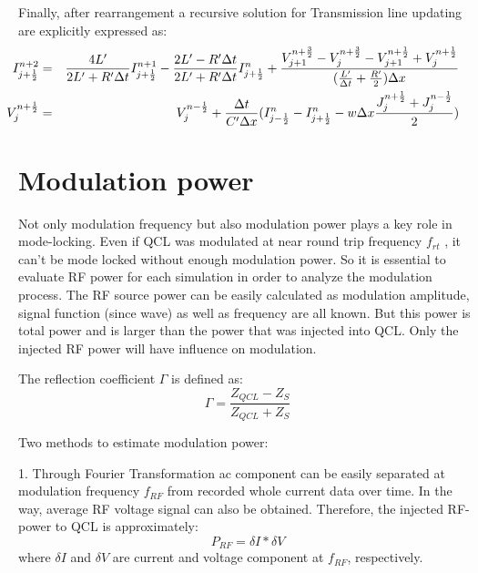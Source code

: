 \documentclass[11pt,final]{scrbook}
\begin{document}
Finally, after rearrangement a recursive solution for Transmission line updating are explicitly expressed as:
\begin{eqnarray}
 \hspace{-8mm} { I }_{ j+\frac{1}{2} }^{ n+2 } &=& \frac { 4L' }{ 2L'+R'\Delta t }{ I }_{ j+\frac{1}{2} }^{ n+1 }-\frac { 2L'-R'\Delta t }{ 2L'+R'\Delta t }{ I }_{ j+\frac{1}{2} }^{ n }+\frac { { V }_{ j+1 }^{ n+\frac{3}{2} }-{ V }_{ j }^{ n+\frac{3}{2}}-{ V }_{ j+1 }^{ n+\frac{1}{2} }+{ V }_{ j }^{ n+\frac{1}{2} } }{  (\frac { L' }{ \Delta t } +\frac { R' }{ 2 })\Delta x }\label{eq:TL_I}\\
 \hspace{-8mm} { V }_{ j }^{ n+\frac{1}{2} } &=& { V }_{ j }^{ n-\frac{1}{2} } + \frac{ \Delta t }{ C'\Delta x } ({ I }_{ j-\frac{1}{2} }^{ n}-{ I }_{ j+\frac{1}{2} }^{ n } - w\Delta x\frac{{J}_{j}^{n+\frac{1}{2}}+{J}_{j}^{n-\frac{1}{2}}}{2}) \label{eq:TL_U}
\end{eqnarray}

\section{Modulation power}
Not only modulation frequency but also modulation power plays a key role in mode-locking. Even if QCL was modulated at near round trip frequency $f_{rt}$ , it can't be mode locked without enough modulation power. So it is essential to evaluate RF power for each simulation in order to analyze the modulation process. The RF source power can be easily calculated as modulation amplitude, signal function (since wave) as well as frequency are all known. But this power is total power and is larger than the power that was injected into QCL. Only the injected RF power will have influence on modulation.

The reflection coefficient $\Gamma$ is defined as:
\begin{equation}
\Gamma = \frac{Z_{QCL}-Z_{S}}{Z_{QCL}+Z_{S}}
\end{equation}

Two methods to estimate modulation power:

1. Through Fourier Transformation ac component can be easily separated at modulation frequency $f_{RF}$ from recorded whole current data over time. In the way, average RF voltage signal can also be obtained. Therefore, the injected RF-power to QCL is approximately:
\begin{equation}
 P_{RF}=\delta I* \delta V
 \end{equation}
where $\delta I$ and $ \delta V$ are current and voltage component at $f_{RF}$, respectively. 
\end{document}
